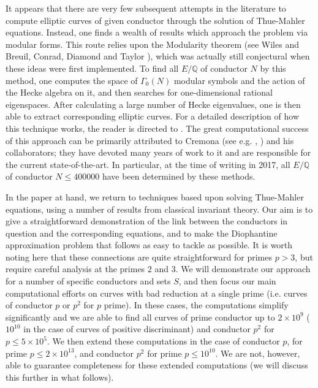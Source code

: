 It appears that there are very few subsequent attempts in the literature to compute elliptic curves of given 
conductor through the solution of Thue-Mahler equations. Instead, one finds a wealth of 
results which approach the problem via modular forms. This route relies upon the Modularity theorem (see Wiles 
\cite{Wi} and Breuil, Conrad, Diamond and Taylor \cite{BCDT}), which was actually still conjectural 
when these ideas were first implemented. To find all $E/\mathbb{Q}$ of conductor $N$ by this method, one computes the 
space of $\Gamma_0(N)$ modular symbols and the action of the Hecke algebra on it, and then searches for one-dimensional 
rational eigenspaces. After calculating a large number of Hecke eigenvalues, one is then able to extract corresponding 
elliptic curves. For a detailed description of how this technique works, the reader is directed to  \cite{Cre2}. The 
great computational success of this approach can be primarily attributed to Cremona (see e.g. \cite{Cre1}, \cite{Cre2}) 
and his collaborators; they have devoted many years of work to it and are responsible for the current state-of-the-art. 
In particular, at the time of writing in 2017, all $E/\mathbb{Q}$ of conductor $N \leq 400000$ have been determined by these methods.

In the paper at hand, we return to techniques based upon solving Thue-Mahler equations, using a 
number of results from classical invariant theory. Our aim is to give a straightforward demonstration of the link 
between the conductors in question and the corresponding equations, and to make the Diophantine approximation problem 
that follows as easy to tackle as possible. It is worth noting here that these connections are quite straightforward for primes $p > 3$, but require 
careful analysis at the primes $2$ and $3$. We will demonstrate our approach for a number of specific conductors and sets $S$, and then focus 
our main computational efforts on curves with bad reduction at a single prime (i.e. curves of conductor $p$ or $p^2$ for 
$p$ prime).  In these cases, the computations simplify significantly and we 
are able to find all curves of prime conductor up to $2 \times 10^9$ ($10^{10}$ in the case of curves of positive 
discriminant) and conductor $p^2$ for $p \leq 5\times 10^5$. We then extend these computations in the case of conductor 
$p$,  for prime $p \leq 2 \times 10^{13}$, and conductor $p^2$ for prime $p \leq 10^{10}$. We are not, however, able to 
guarantee completeness for these extended computations (we will discuss this further in what follows). 

